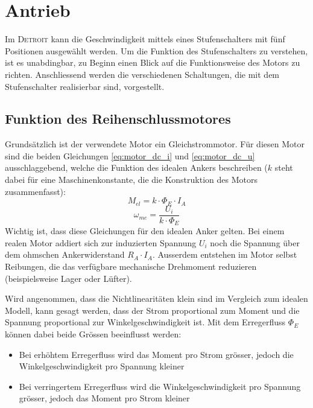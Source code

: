 \section{Antrieb}

Im \textsc{Detroit} kann die Geschwindigkeit mittels eines Stufenschalters mit fünf Positionen ausgewählt werden. Um die Funktion des Stufenschalters zu verstehen, ist es unabdingbar, zu Beginn einen Blick auf die Funktionsweise des Motors zu richten. Anschliessend werden die verschiedenen Schaltungen, die mit dem Stufenschalter realisierbar sind, vorgestellt.

\subsection{Funktion des Reihenschlussmotores}\label{gm}

Grundsätzlich ist der verwendete Motor ein Gleichstrommotor. Für diesen Motor sind die beiden Gleichungen \ref{eq:motor_dc_i} und \ref{eq:motor_dc_u} ausschlaggebend, welche die Funktion des idealen Ankers beschreiben ($k$ steht dabei für eine Maschinenkonstante, die die Konstruktion des Motors zusammenfasst):
\begin{equation}
	M_{el}=k\cdot\Phi_E\cdot I_A
\label{eq:motor_dc_i}
\end{equation}
\begin{equation}
	\omega_{me}=\frac{U_i}{k\cdot \Phi_E}
\label{eq:motor_dc_u}
\end{equation}
Wichtig ist, dass diese Gleichungen für den idealen Anker gelten. Bei einem realen Motor addiert sich zur induzierten Spannung $U_i$ noch die Spannung über dem ohmschen Ankerwiderstand $R_A\cdot I_A$. Ausserdem entstehen im Motor selbst Reibungen, die das verfügbare mechanische Drehmoment reduzieren (beispielsweise Lager oder Lüfter).

Wird angenommen, dass die Nichtlinearitäten klein sind im Vergleich zum idealen Modell, kann gesagt werden, dass der Strom proportional zum Moment und die Spannung proportional zur Winkelgeschwindigkeit ist. Mit dem Erregerfluss $\Phi_E$ können dabei beide Grössen beeinflusst werden: \begin{itemize}
	\item Bei erhöhtem Erregerfluss wird das Moment pro Strom grösser, jedoch die Winkelgeschwindigkeit pro Spannung kleiner
	\item Bei verringertem Erregerfluss wird die Winkelgeschwindigkeit pro Spannung grösser, jedoch das Moment pro Strom kleiner
\end{itemize}

